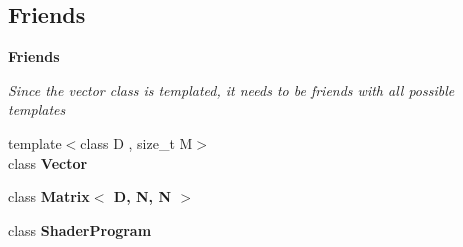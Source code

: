 \subsection*{Friends}
\begin{Indent}\textbf{ Friends}\par
{\em Since the vector class is templated, it needs to be friends with all possible templates }\begin{DoxyCompactItemize}
\item 
\mbox{\label{classrev_1_1_vector_ac14c06b74acbf135ede85924e7b3d521}} 
{\footnotesize template$<$class D , size\+\_\+t M$>$ }\\class {\bfseries Vector}
\item 
\mbox{\label{classrev_1_1_vector_a810fb2b6b160d8711d2610dd28acea36}} 
class {\bfseries Matrix$<$ D, N, N $>$}
\item 
\mbox{\label{classrev_1_1_vector_aef20119bde6aff11ffd23f3ea2131b86}} 
class {\bfseries Shader\+Program}
\end{DoxyCompactItemize}
\end{Indent}
